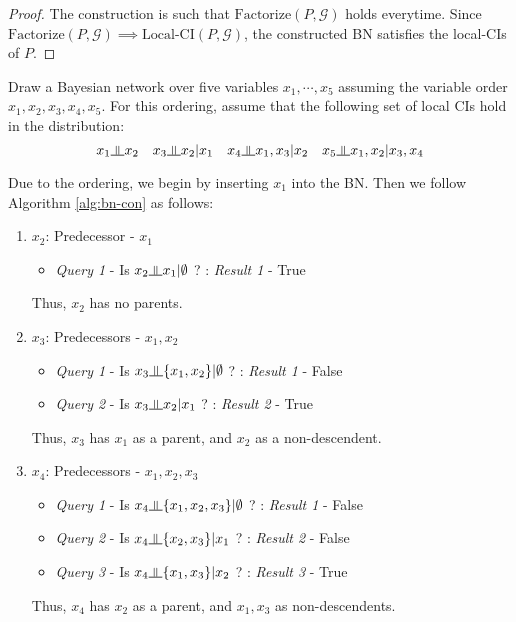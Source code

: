 \begin{proof}
The construction is such that $\text{Factorize}(P, \mathcal G)$ holds everytime. Since $\text{Factorize}(P, \mathcal G) \implies \text{Local-CI}(P, \mathcal G)$, the constructed BN satisfies the local-CIs of $P$.
\end{proof}
\begin{quest}[Construction of BN]
Draw a Bayesian network over five variables $x_1,\cdots, x_5$ assuming the variable order $x_1, x_2, x_3, x_4, x_5$.
For this ordering, assume that the following set of local CIs hold in the distribution: 
\[x_1\ind x_2\quad x_3\ind x_2|x_1\quad x_4\ind x_1,x_3|x_2\quad x_5\ind x_1, x_2|x_3,x_4\]
\end{quest}
\begin{ans}
Due to the ordering, we begin by inserting $x_1$ into the BN. Then we follow Algorithm \ref{alg:bn-con} as follows:
\begin{enumerate}[leftmargin=1cm]
	\item $x_2$: Predecessor - $x_1$ \\
	\begin{itemize}[leftmargin=0.5cm]
	\item	\textit{Query 1} - Is $x_2 \ind x_1 | \emptyset$ ? :\textit{ Result 1} - True
	\end{itemize}
	Thus, $x_2$ has no parents.
	\item $x_3$: Predecessors - $x_1, x_2$
	\begin{itemize}[leftmargin=0.5cm]
		\item	\textit{Query 1} - Is $x_3 \ind \{x_1, x_2\} | \emptyset$ ? :\textit{ Result 1} - False
		\item	\textit{Query 2} - Is $x_3 \ind  x_2 | x_1$ ? :\textit{ Result 2} - True
	\end{itemize}
	Thus, $x_3$ has $x_1$ as a parent, and $x_2$ as a non-descendent.
	\item $x_4$: Predecessors - $x_1, x_2, x_3$
	\begin{itemize}[leftmargin=0.5cm]
		\item	\textit{Query 1} - Is $x_4 \ind \{x_1, x_2, x_3\} | \emptyset$ ? :\textit{ Result 1} - False
		\item	\textit{Query 2} - Is $x_4 \ind  \{x_2, x_3\} | x_1$ ? :\textit{ Result 2} - False
		\item	\textit{Query 3} - Is $x_4 \ind  \{x_1, x_3\} | x_2$ ? :\textit{ Result 3} - True
	\end{itemize}
	Thus, $x_4$ has $x_2$ as a parent, and $x_1, x_3$ as non-descendents.

\end{enumerate}
\end{ans}
